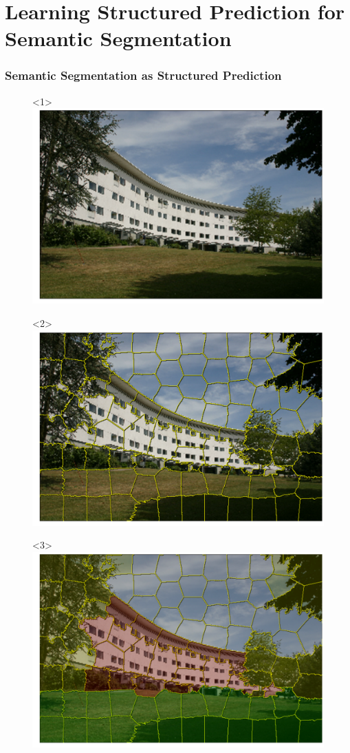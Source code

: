 \documentclass[final,ignorenonframetext,compress]{beamer}
\begin{document}
\section{Learning Structured Prediction for Semantic Segmentation}
\begin{frame}
    \frametitle{Semantic Segmentation as Structured Prediction}
    \begin{figure}
        \begin{onlyenv}<1>
            \includegraphics[width=.6\linewidth]{images/scene_sp_org}%
        \end{onlyenv}%
        \begin{onlyenv}<2>
            \includegraphics[width=.6\linewidth]{images/scene_sp}%
        \end{onlyenv}%
        \begin{onlyenv}<3>
            \includegraphics[width=.6\linewidth]{images/scene_sp_gt}%
        \end{onlyenv}%

\end{figure}
\end{frame}
\end{document}
